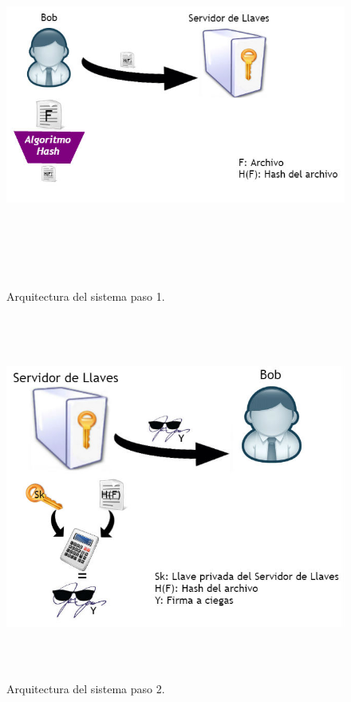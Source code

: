\begin{figure}[H]
\centering
	\includegraphics[width=16cm, height=12cm]{./images/Paso01.jpg}
	\caption{Arquitectura del sistema paso 1.}

\end{figure}

\begin{figure}[H]
\centering
	\includegraphics[width=16cm, height=12cm]{./images/Paso02.jpg}
	\caption{Arquitectura del sistema paso 2.}

\end{figure}

